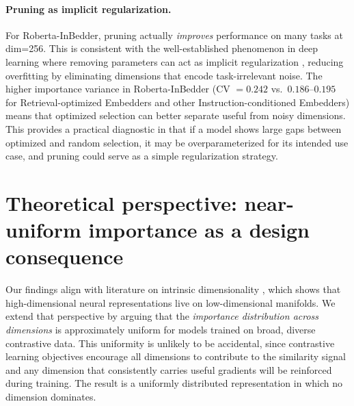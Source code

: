 \documentclass[11pt,a4paper]{article}
\begin{document}
\paragraph{Pruning as implicit regularization.}
For Roberta-InBedder, pruning actually \emph{improves} performance on many tasks at dim=256. This is consistent with the well-established phenomenon in deep learning where removing parameters can act as implicit regularization \citep{han2015pruning,lottery-ticket}, reducing overfitting by eliminating dimensions that encode task-irrelevant noise. The higher importance variance in Roberta-InBedder (CV $= 0.242$ vs.\ $0.186$--$0.195$ for Retrieval-optimized Embedders and other Instruction-conditioned Embedders) means that optimized selection can better separate useful from noisy dimensions. This provides a practical diagnostic in that if a model shows large gaps between optimized and random selection, it may be overparameterized for its intended use case, and pruning could serve as a simple regularization strategy.

\section{Theoretical perspective: near-uniform importance as a design consequence}
\label{theoretical_perspective}
Our findings align with literature on intrinsic dimensionality \citep{li2018measuring,alemohammad2023intrinsic}, which shows that high-dimensional neural representations live on low-dimensional manifolds. We extend that perspective by arguing that the \emph{importance distribution across dimensions} is approximately uniform for models trained on broad, diverse contrastive data. This uniformity is unlikely to be accidental, since contrastive learning objectives encourage all dimensions to contribute to the similarity signal and any dimension that consistently carries useful gradients will be reinforced during training. The result is a uniformly distributed representation in which no dimension dominates.
\end{document}
